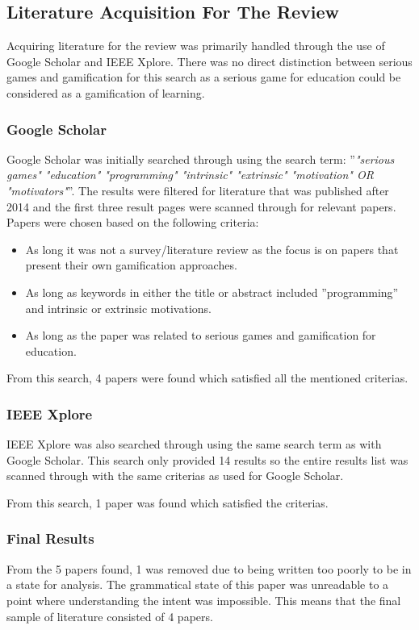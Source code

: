 \subsection{Literature Acquisition For The Review}
Acquiring literature for the review was primarily handled through the use of Google Scholar and IEEE Xplore. There was no direct distinction between serious games and gamification for this search as a serious game for education could be considered as a gamification of learning. 

\subsubsection{Google Scholar}
Google Scholar was initially searched through using the search term: ''\emph{"serious games" "education" "programming" "intrinsic" "extrinsic" "motivation" OR "motivators"}''. The results were filtered for literature that was published after 2014 and the first three result pages were scanned through for relevant papers. Papers were chosen based on the following criteria: 

\begin{itemize}
    \item As long it was not a survey/literature review as the focus is on papers that present their own gamification approaches.  
    \item As long as keywords in either the title or abstract included ''programming'' and intrinsic or extrinsic motivations. 
    \item As long as the paper was related to serious games and gamification for education. 
\end{itemize}

From this search, 4 papers were found which satisfied all the mentioned criterias. 

\subsubsection{IEEE Xplore}
IEEE Xplore was also searched through using the same search term as with Google Scholar. This search only provided 14 results so the entire results list was scanned through with the same criterias as used for Google Scholar. 

From this search, 1 paper was found which satisfied the criterias. 

\subsubsection{Final Results} 
From the 5 papers found, 1 was removed due to being written too poorly to be in a state for analysis. The grammatical state of this paper was unreadable to a point where understanding the intent was impossible. This means that the final sample of literature consisted of 4 papers. 
